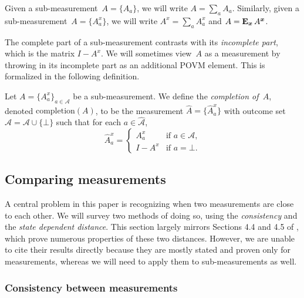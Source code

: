 \documentclass[11pt]{article}
\theoremstyle{definition}
\newcommand{\E}{\mathop{\bf E\/}}
\newcommand{\calA}{\mathcal{A}}
\newcommand{\bx}{{\boldsymbol{x}}}
\begin{document}
\begin{notation}
Given a sub-measurement~$A = \{A_a\}$, we will write $A = \sum_a A_a$.
Similarly, given a sub-measurement~$A = \{A^x_a\}$, we will write $A^x = \sum_a A^x_a$ and $A = \E_{\bx} A^{\bx}$.
\end{notation}

The complete part of a sub-measurement
contrasts with its \emph{incomplete part},
which is the matrix $I - A^x$.
We will sometimes
view~$A$ as a measurement
by throwing in its incomplete part as an additional POVM element.
This is formalized in the following definition.

\begin{definition}\label{def:measurement-completion}
Let $A = \{A^x_a\}_{a \in \calA}$ be a sub-measurement.
We define the \emph{completion of~$A$},
denoted $\mathrm{completion}(A)$,
to be the measurement $\widehat{A} = \{\widehat{A}^x_a\}$
with outcome set $\widehat{\calA} = \calA \cup \{\bot\}$
such that for each $a \in \widehat{\calA}$,
\begin{equation*}
\widehat{A}^x_a
= \left\{\begin{array}{cl}
		A^x_a & \text{if $a \in \calA$,}\\
		I - A^x & \text{if $a = \bot$}.
		\end{array}\right.
\end{equation*}
\end{definition}

\subsection{Comparing measurements}
\label{sec:comparing-measurements}

A central problem in this paper is recognizing when two measurements are close to each other.
We will survey two methods of doing so,
using the \emph{consistency} and the \emph{state dependent distance}.
This section largely mirrors Sections 4.4 and 4.5 of \cite{NW19},
which prove numerous properties of these two distances.
However, we are unable to cite their results directly
because they are mostly stated and proven only for measurements,
whereas we will need to apply them to sub-measurements as well.

\subsubsection{Consistency between measurements}
\end{document}
